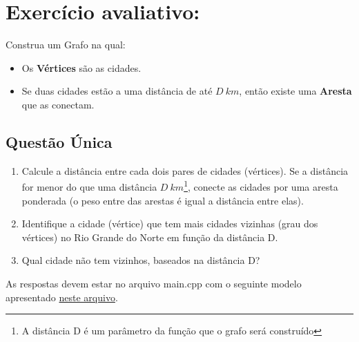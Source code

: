 \documentclass[12pt,a4paper]{article}
\begin{document}
\newpage

\section*{Exercício avaliativo:}

Construa um Grafo na qual:

\begin{itemize}
    \item Os \textbf{Vértices} são as cidades.
    \item Se duas cidades estão a uma distância de até $D\ km$, então existe uma \textbf{Aresta} que as conectam.
\end{itemize}

\subsection*{Questão Única}
\begin{enumerate}[label=\Roman*)]
    \item Calcule a distância entre cada dois pares de cidades (vértices). Se a distância for menor do que uma distância $D\ km$\footnote{A distância D é um parâmetro da função que o grafo será construído}, conecte as cidades por uma aresta ponderada (o peso entre das arestas é igual a distância entre elas).
    \item Identifique a cidade (vértice) que tem mais cidades vizinhas (grau dos vértices) no Rio Grande do Norte em função da distância D.
    \item Qual cidade não tem vizinhos, baseados na distância D?
    \end{enumerate}

    As respostas devem estar no arquivo main.cpp com o seguinte modelo apresentado \href{https://github.com/kennedyufersa/scriptLab/main.cpp}{neste arquivo}.
\end{document}
